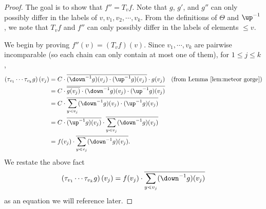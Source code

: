 \begin{proof}
The goal is to show that $f''=T_v f$.
Note that $g$, $g'$, and $g''$ can only possibly differ in the labels of $v,v_1,v_2,\cdots,v_k$. From the definitions of $\Theta$ and $\up^{-1}$, we note that
$T_v f$ and $f''$ can only possibly differ in the labels of elements $\leq v$.

We begin by proving $f''(v)=(T_v f)(v)$. Since $v_1,\cdots,v_k$ are pairwise incomparable
(so each chain can only contain at most one of them), for $1\leq j\leq k$,
\begin{align*}
\left(\tau_{v_1}\cdots \tau_{v_k} g\right)(v_j)
&=
C\cdot \overline{(\down^{-1}g)(v_j)\cdot(\up^{-1}g)(v_j)}\cdot g(v_j)
&\text{(from Lemma~\ref{lem:meteor gorge})}\\
&=
C\cdot \overline{\overline{g(v_j)}\cdot(\down^{-1}g)(v_j)\cdot(\up^{-1}g)(v_j)}\\
&=C\cdot \overline{\sum\limits_{y\lessdot v_j}(\down^{-1}g)(v_j)\cdot(\up^{-1}g)(v_j)}\\
&=C\cdot \overline{(\up^{-1}g)(v_j)}\cdot\overline{\sum\limits_{y\lessdot v_j}(\down^{-1}g)(v_j)}\\
&=f(v_j)\cdot\overline{\sum\limits_{y\lessdot v_j}(\down^{-1}g)(v_j)}.
\end{align*}
We restate the above fact
\begin{equation}\label{eq:the lost city}
 \left(\tau_{v_1}\cdots \tau_{v_k} g\right)(v_j)
 = f(v_j)\cdot\overline{\sum\limits_{y\lessdot v_j}(\down^{-1}g)(v_j)}
\end{equation}
as an equation we will reference later.


\end{proof}
